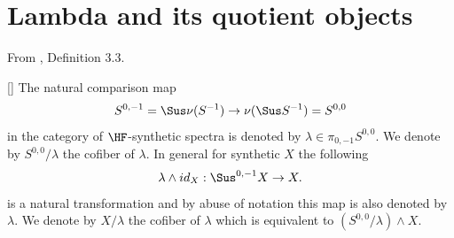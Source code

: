\section{Lambda and its quotient objects}

\begin{definition}
\label{paper:3.3}
From \cite{LWX126}, Definition 3.3.\par
[{\cite[Definition 4.27]{Pst}}]
    The natural comparison map
    $$S^{0,-1}=\Sus \nu (S^{-1})\to \nu(\Sus S^{-1})=S^{0,0}$$
    in the category of $\HF$-synthetic spectra is denoted by $\lambda\in \pi_{0,-1}S^{0,0}$. We denote by $S^{0,0}/\lambda$ the cofiber of $\lambda$. In general for synthetic $X$ the following
    $$\lambda\wedge id_X: \Sus^{0,-1}X\to X.$$
    is a natural transformation and by abuse of notation this map is also denoted by $\lambda$.
    We denote by $X/\lambda$ the cofiber of $\lambda$
    which is equivalent to $(S^{0,0}/\lambda) \wedge X$.




\sketch
\end{definition}

